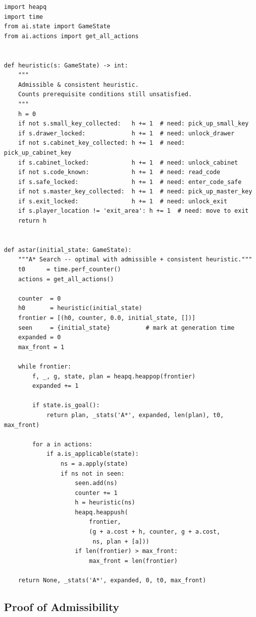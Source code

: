 \documentclass[12pt, a4paper]{report}
\begin{document}
\begin{lstlisting}[style=pyStyle,
  caption={A* heuristic and search (\texttt{ai/algorithms/astar.py}).},
  label=lst:astar]
import heapq
import time
from ai.state import GameState
from ai.actions import get_all_actions


def heuristic(s: GameState) -> int:
    """
    Admissible & consistent heuristic.
    Counts prerequisite conditions still unsatisfied.
    """
    h = 0
    if not s.small_key_collected:   h += 1  # need: pick_up_small_key
    if s.drawer_locked:             h += 1  # need: unlock_drawer
    if not s.cabinet_key_collected: h += 1  # need: pick_up_cabinet_key
    if s.cabinet_locked:            h += 1  # need: unlock_cabinet
    if not s.code_known:            h += 1  # need: read_code
    if s.safe_locked:               h += 1  # need: enter_code_safe
    if not s.master_key_collected:  h += 1  # need: pick_up_master_key
    if s.exit_locked:               h += 1  # need: unlock_exit
    if s.player_location != 'exit_area': h += 1  # need: move to exit
    return h


def astar(initial_state: GameState):
    """A* Search -- optimal with admissible + consistent heuristic."""
    t0      = time.perf_counter()
    actions = get_all_actions()

    counter  = 0
    h0       = heuristic(initial_state)
    frontier = [(h0, counter, 0.0, initial_state, [])]
    seen     = {initial_state}          # mark at generation time
    expanded = 0
    max_front = 1

    while frontier:
        f, _, g, state, plan = heapq.heappop(frontier)
        expanded += 1

        if state.is_goal():
            return plan, _stats('A*', expanded, len(plan), t0, max_front)

        for a in actions:
            if a.is_applicable(state):
                ns = a.apply(state)
                if ns not in seen:
                    seen.add(ns)
                    counter += 1
                    h = heuristic(ns)
                    heapq.heappush(
                        frontier,
                        (g + a.cost + h, counter, g + a.cost,
                         ns, plan + [a]))
                    if len(frontier) > max_front:
                        max_front = len(frontier)

    return None, _stats('A*', expanded, 0, t0, max_front)
\end{lstlisting}

\subsection{Proof of Admissibility}
\end{document}
